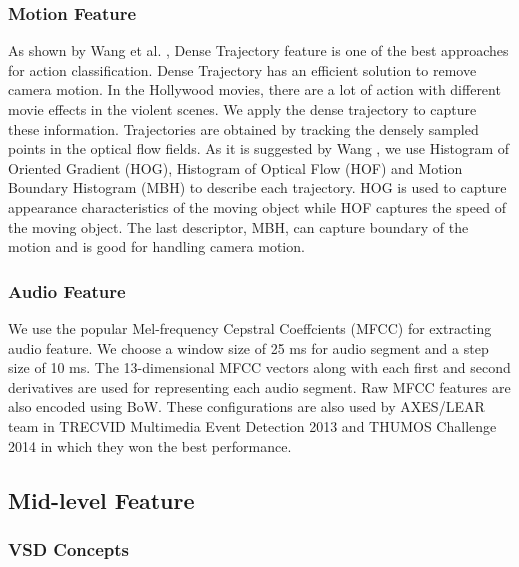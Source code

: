 \documentclass[twocolumn]{bmcart}%
\begin{document}
\subsubsection{Motion Feature}
As shown by Wang et al. \cite{wang2013action}, Dense Trajectory feature is one of the best approaches for action classification. Dense Trajectory has an efficient solution to remove camera motion. In the Hollywood movies, there are a lot of action with different movie effects in the violent scenes. We apply the dense trajectory to capture these information. Trajectories are obtained by tracking the densely sampled points in the optical flow fields. As it is suggested by Wang \cite{wang2013action}, we use Histogram of Oriented Gradient (HOG), Histogram of Optical Flow (HOF) and Motion Boundary Histogram (MBH) to describe each trajectory. HOG is used to capture appearance characteristics of the moving object while HOF captures the speed of the moving object. The last descriptor, MBH, can capture boundary of the motion and is good for handling camera motion.

\subsubsection{Audio Feature}
We use the popular Mel-frequency Cepstral Coeffcients (MFCC) \cite{rabiner2007introduction} for extracting audio feature. We choose a window size of 25 ms for audio segment and a step size of 10 ms. The 13-dimensional MFCC vectors along with each first and second derivatives are used for representing each audio segment. Raw MFCC features are also encoded using BoW. These configurations are also used by AXES/LEAR team in TRECVID Multimedia Event Detection 2013 \cite{aly2013axes} and THUMOS Challenge 2014 \cite{oneata2014lear} in which they won the best performance.

\subsection{Mid-level Feature}
\subsubsection{VSD Concepts}
\end{document}
